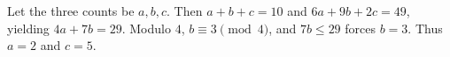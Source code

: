 Let the three counts be $a,b,c$. Then $a+b+c=10$ and $6a+9b+2c=49$, yielding $4a+7b=29$. Modulo $4$, $b\equiv3\pmod4$, and $7b\le29$ forces $b=3$. Thus $a=2$ and $c=\boxed5$.
